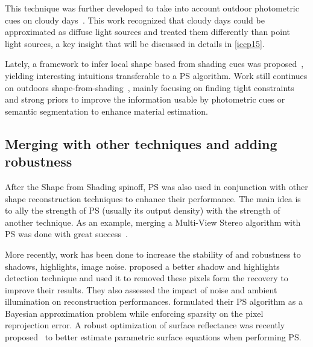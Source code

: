 This technique was further developed to take into account outdoor photometric cues on cloudy days~\cite{Langer1994}. This work recognized that cloudy days could be approximated as diffuse light sources and treated them differently than point light sources, a key insight that will be discussed in details in \ref{iccp15}.

Lately, a framework to infer local shape based from shading cues was proposed~\cite{Xiong2013}, yielding interesting intuitions transferable to a PS algorithm. Work still continues on outdoors shape-from-shading~\cite{oxholm-eccv-12,johnson-cvpr-11,barron-pami-15}, mainly focusing on finding tight constraints and strong priors to improve the information usable by photometric cues or semantic segmentation to enhance material estimation.

\subsection{Merging with other techniques and adding robustness}
After the Shape from Shading spinoff, PS was also used in conjunction with other shape reconstruction techniques to enhance their performance. The main idea is to ally the strength of PS (usually its output density) with the strength of another technique. As an example, merging a Multi-View Stereo algorithm with PS was done with great success~\cite{HernandezEsteban2008}.

More recently, work has been done to increase the stability of and robustness to shadows, highlights, image noise. \cite{BarskyPetrou-pami-2003} proposed a better shadow and highlights detection technique and used it to removed these pixels form the recovery to improve their results. They also assessed the impact of noise and ambient illumination on reconstruction performances. \cite{ikehata-cvpr-12} formulated their PS algorithm as a Bayesian approximation problem while enforcing sparsity on the pixel reprojection error. A robust optimization of surface reflectance was recently proposed~\cite{ikehata-cvpr-14} to better estimate parametric surface equations when performing PS.

